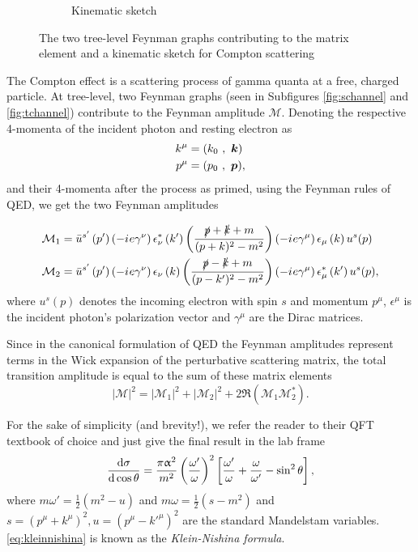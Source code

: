 \begin{figure}
\begin{subfigure}{0.45\textwidth}
		\caption{Kinematic sketch}
		\label{fig:kinematics}
	\end{subfigure}
	\caption{The two tree-level Feynman graphs contributing to the matrix element and a kinematic sketch for Compton scattering}
\end{figure}

The Compton effect is a scattering process of gamma quanta at a free, charged particle. At tree-level, two Feynman graphs (seen in Subfigures \ref{fig:schannel} and \ref{fig:tchannel}) contribute to the Feynman amplitude $\mathcal{M}$.
Denoting the respective 4-momenta of the incident photon and resting electron as
\begin{align*}
	k^\mu &= (k_0\ ,\ \boldsymbol{k}) \\
	p^\mu &= (p_0\ ,\ \boldsymbol{p}),
\end{align*}
and their 4-momenta after the process as primed, using the Feynman rules of QED, we get the two Feynman amplitudes

\begin{align*}
	\mathcal{M}_1 &= \bar{u}^{s'}\left(p'\right)\left(-{i\mkern1mu} e\gamma^\nu\right)\epsilon^{*}_\nu\left(k'\right)\left(\frac{\slashed{p}+\slashed{k}+m}{(p+k)^2-m^2}\right)\left(-{i\mkern1mu} e\gamma^\mu\right)\epsilon_\mu\left(k\right)u^s(p)\\
	\mathcal{M}_2 &= \bar{u}^{s'}\left(p'\right)\left(-{i\mkern1mu} e\gamma^\nu\right)\epsilon_\nu\left(k\right)\left(\frac{\slashed{p}-\slashed{k}+m}{(p-k')^2-m^2}\right)\left(-{i\mkern1mu} e\gamma^\mu\right)\epsilon^{*}_\mu\left(k'\right)u^s(p),
\end{align*}
where $u^s(p)$ denotes the incoming electron with spin $s$ and momentum $p^\mu$, $\epsilon^\mu$ is the incident photon's polarization vector and $\gamma^\mu$ are the Dirac matrices.

Since in the canonical formulation of QED the Feynman amplitudes represent terms in the Wick expansion of the perturbative scattering matrix, the total transition amplitude is equal to the sum of these matrix elements
\begin{equation*}
	|\mathcal{M}|^2 = |\mathcal{M}_1|^2 + |\mathcal{M}_2|^2 + 2\Re\left(\mathcal{M}_1\mathcal{M}_2^*\right).
\end{equation*}

For the sake of simplicity (and brevity!), we refer the reader to their QFT textbook of choice and just give the final result in the lab frame
\begin{equation}\label{eq:kleinnishina}
	\frac{\text{d}\sigma}{\text{d}\cos\theta} = \frac{\pi\upalpha^2}{m^2}\left(\frac{\omega'}{\omega}\right)^2\left[\frac{\omega'}{\omega} + \frac{\omega}{\omega'} - \sin^2\theta\right],
\end{equation}
where $m\omega' = \frac{1}{2}\left(m^2-u\right)$ and $m\omega = \frac{1}{2}\left(s-m^2\right)$ and $s=\left(p^\mu + k^\mu\right)^2, u=\left(p^\mu - k'^\mu\right)^2$ are the standard Mandelstam variables.
\autoref{eq:kleinnishina} is known as the \textit{Klein-Nishina formula}.

